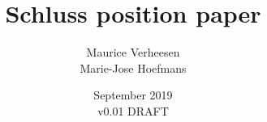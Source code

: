 \documentclass{article}
\title{Schluss position paper}
\author{Maurice Verheesen \\ Marie-Jose Hoefmans}
\date{September 2019 \\ v0.01 DRAFT}
\begin{document}
\maketitle
\begin{abstract}
% 
% 
% 
% 
% 
% 
\end{abstract}
\end{document}
